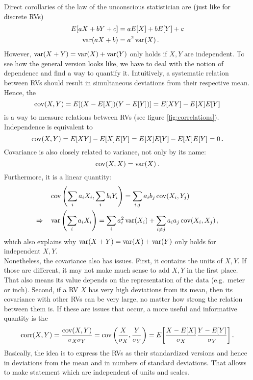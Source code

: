 Direct corollaries of the law of the unconscious statistician are (just like for discrete RVs)
\begin{align*}
E[a X + b Y + c] &= a E[X] + b E[Y] + c
\\
\operatorname{var}(a X + b) &= a^2 \operatorname{var}(X) \, .
\end{align*}
However, $\operatorname{var}(X + Y) = \operatorname{var}(X) + \operatorname{var}(Y)$ only holds if $X, Y$ are independent. To see how the general version looks like, we have to deal with the notion of dependence and find a way to quantify it. Intuitively, a systematic relation between RVs should result in simultaneous deviations from their respective mean. Hence, the 
\begin{equation}
\operatorname{cov}(X, Y) = E[(X - E[X]) (Y - E[Y])] = E[X Y] - E[X] E[Y]
\end{equation}
is a way to measure relations between RVs (see figure \ref{fig:correlations}). Independence is equivalent to
\begin{equation}
\operatorname{cov}(X, Y) = E[X Y] - E[X] E[Y] = E[X] E[Y] - E[X] E[Y] = 0 \, .
\end{equation}
Covariance is also closely related to variance, not only by its name:
\begin{equation}
\operatorname{cov}(X, X) = \operatorname{var}(X) \, .
\end{equation}
Furthermore, it is a linear quantity:
\begin{equation}
\begin{split}
&\operatorname{cov}\qty(\sum_i a_i X_i, \sum_i b_i Y_i) = \sum_{i, j} a_i b_j \operatorname{cov}(X_i, Y_j)
\\
\Rightarrow \quad &\operatorname{var}\qty(\sum_i a_i X_i) = \sum_i a_i^2 \operatorname{var}(X_i) + \sum_{i \neq j} a_i a_j \operatorname{cov}(X_i, X_j) \, ,
\end{split}
\end{equation}
which also explains why $\operatorname{var}(X + Y) = \operatorname{var}(X) + \operatorname{var}(Y)$ only holds for independent $X, Y$.\\


Nonetheless, the covariance also has issues. First, it contains the units of $X, Y$. If those are different, it may not make much sense to add $X, Y$ in the first place. That also means its value depends on the representation of the data (e.g.~meter or inch). Second, if a RV $X$ has very high deviations from its mean, then its covariance with other RVs can be very large, no matter how strong the relation between them is. If these are issues that occur, a more useful and informative quantity is the 
\begin{equation}
\operatorname{corr}(X, Y) = \frac{\operatorname{cov}(X, Y)}{\sigma_X \sigma_Y} = \operatorname{cov}\qty(\frac{X}{\sigma_X}, \frac{Y}{\sigma_Y})
= E\qty[\frac{X - E[X]}{\sigma_X} \frac{Y - E[Y]}{\sigma_Y}] \, .
\end{equation}
Basically, the idea is to express the RVs as their standardized versions and hence in deviations from the mean and in numbers of standard deviations. That allows to make statement which are independent of units and scales.\\



